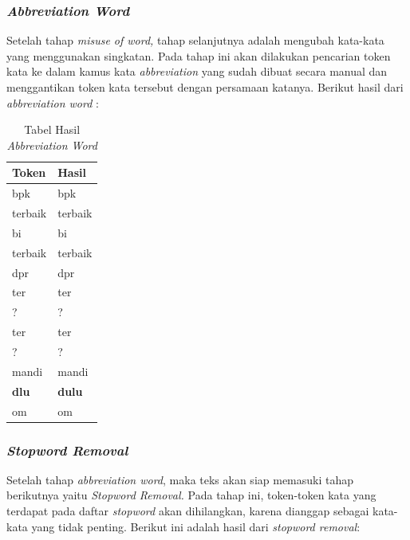 \subsubsection{\textit{Abbreviation Word}}
Setelah tahap \textit{misuse of word, }tahap selanjutnya adalah 
mengubah kata-kata yang menggunakan singkatan. Pada tahap ini akan 
dilakukan pencarian token kata ke dalam kamus kata \textit{abbreviation
} yang sudah dibuat secara manual dan menggantikan token kata tersebut 
dengan persamaan katanya. Berikut hasil dari \textit{abbreviation word
}:
\begin{small}
	\begin{longtable}{|p{2cm}|p{2cm}|}
		\caption{Tabel Hasil \textit{Abbreviation Word}}\\
		\hline
		\textbf{Token} & \textbf{Hasil} \\
		\hline
		\endhead
		bpk & bpk \\
		\hline
		terbaik & terbaik \\
		\hline
		bi & bi \\
		\hline
		terbaik & terbaik \\
		\hline
		dpr & dpr \\
		\hline
		ter & ter \\
		\hline
		? & ? \\
		\hline		
		ter & ter \\
		\hline
		? & ? \\
		\hline
		mandi & mandi \\
		\hline
		\textbf{dlu} & \textbf{dulu} \\
		\hline
		om & om \\
		\hline	
	\end{longtable}
\end{small}
\subsubsection{\textit{Stopword Removal}}
Setelah tahap \textit{abbreviation word}, maka teks akan siap 
memasuki tahap berikutnya yaitu \textit{Stopword Removal. }Pada tahap 
ini, token-token kata yang terdapat pada daftar \textit{stopword} akan 
dihilangkan, karena dianggap sebagai kata-kata yang tidak 
penting. Berikut ini adalah hasil dari \textit{stopword removal}:

